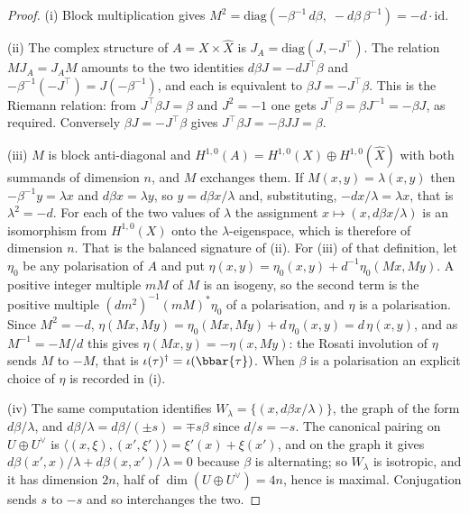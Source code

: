 \begin{proof}
(i) Block multiplication gives
$M^{2}=\mathrm{diag}(-\beta^{-1}\,d\beta,\;-d\beta\,\beta^{-1})=-d\cdot\mathrm{id}$.

(ii) The complex structure of $A=X\times\widehat{X}$ is
$J_{A}=\mathrm{diag}(J,-J^{\top})$. The relation $MJ_{A}=J_{A}M$ amounts to
the two identities $d\beta J=-dJ^{\top}\beta$ and
$-\beta^{-1}(-J^{\top})=J(-\beta^{-1})$, and each is equivalent to
$\beta J=-J^{\top}\beta$. This is the Riemann relation: from
$J^{\top}\beta J=\beta$ and $J^{2}=-1$ one gets
$J^{\top}\beta=\beta J^{-1}=-\beta J$, as required. Conversely
$\beta J=-J^{\top}\beta$ gives $J^{\top}\beta J=-\beta J J=\beta$.

(iii) $M$ is block anti-diagonal and $H^{1,0}(A)=H^{1,0}(X)\oplus
H^{1,0}(\widehat{X})$ with both summands of dimension $n$, and $M$ exchanges
them. If $M(x,y)=\lambda(x,y)$ then $-\beta^{-1}y=\lambda x$ and
$d\beta x=\lambda y$, so $y=d\beta x/\lambda$ and, substituting,
$-dx/\lambda=\lambda x$, that is $\lambda^{2}=-d$. For each of
the two values of $\lambda$ the assignment $x\mapsto(x,d\beta x/\lambda)$ is an
isomorphism from $H^{1,0}(X)$ onto the $\lambda$-eigenspace, which is
therefore of dimension $n$. That is the balanced signature of
(ii). For (iii) of that definition, let $\eta_{0}$ be any
polarisation of $A$ and put
$\eta(x,y)=\eta_{0}(x,y)+d^{-1}\eta_{0}(Mx,My)$. A positive integer multiple
$mM$ of $M$ is an isogeny, so the second term is the positive multiple
$(dm^{2})^{-1}(mM)^{*}\eta_{0}$ of a polarisation, and $\eta$ is a
polarisation. Since $M^{2}=-d$,
$\eta(Mx,My)=\eta_{0}(Mx,My)+d\,\eta_{0}(x,y)=d\,\eta(x,y)$, and as
$M^{-1}=-M/d$ this gives $\eta(Mx,y)=-\eta(x,My)$: the Rosati involution of
$\eta$ sends $M$ to $-M$, that is $\iota(\tau)^{\dagger}=\iota(\bbar{\tau})$.
When $\beta$ is a polarisation an explicit choice of $\eta$ is recorded in
(i).

(iv) The same computation identifies $W_{\lambda}=\{(x,d\beta x/\lambda)\}$,
the graph of the form $d\beta/\lambda$, and
$d\beta/\lambda=d\beta/(\pm s)=\mp s\beta$ since $d/s=-s$. The canonical
pairing on $U\oplus U^{\vee}$ is
$\langle(x,\xi),(x',\xi')\rangle=\xi'(x)+\xi(x')$, and on the graph it gives
$d\beta(x',x)/\lambda+d\beta(x,x')/\lambda=0$ because $\beta$ is alternating; so
$W_{\lambda}$ is isotropic, and it has dimension $2n$, half of
$\dim(U\oplus U^{\vee})=4n$, hence is maximal. Conjugation sends $s$ to $-s$
and so interchanges the two.
\end{proof}

